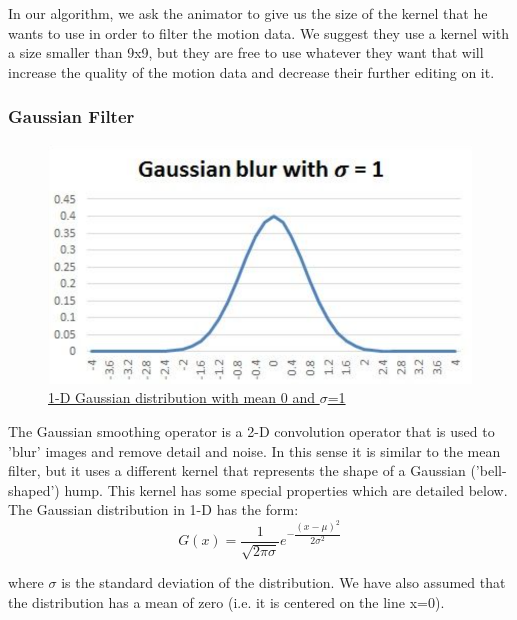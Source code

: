 In our algorithm, we ask the animator to give us the size of the kernel that he wants to use in order to filter the motion data. We suggest they use a kernel with a size smaller than 9x9, but they are free to use whatever they want that will increase the quality of the motion data and decrease their further editing on it.

\subsubsection*{Gaussian Filter}

\begin{figure}[h]
	\centering
	\includegraphics[width=1\textwidth]{figures/Implementation/Gaussian1D.png}
	\captionsetup{labelformat=empty}
	\caption{\href{https://fiveko.com/assets/pics/math/gauss1d_shape.jpg}
	{ 1-D Gaussian distribution with mean 0 and $\sigma$=1}}
\end{figure}

The Gaussian smoothing operator is a 2-D convolution operator that is used to 'blur' images and remove detail and noise. In this sense it is similar to the mean filter, but it uses a different kernel that represents the shape of a Gaussian ('bell-shaped') hump. This kernel has some special properties which are detailed below.\\
The Gaussian distribution in 1-D has the form:
$$ G(x) = \dfrac{1}{\sqrt{2\pi\sigma}} e^{-\dfrac{(x-\mu)^2}{2\sigma^2}}$$

where $\sigma$ is the standard deviation of the distribution. We have also assumed that the distribution has a mean of zero (i.e. it is centered on the line x=0). \\

